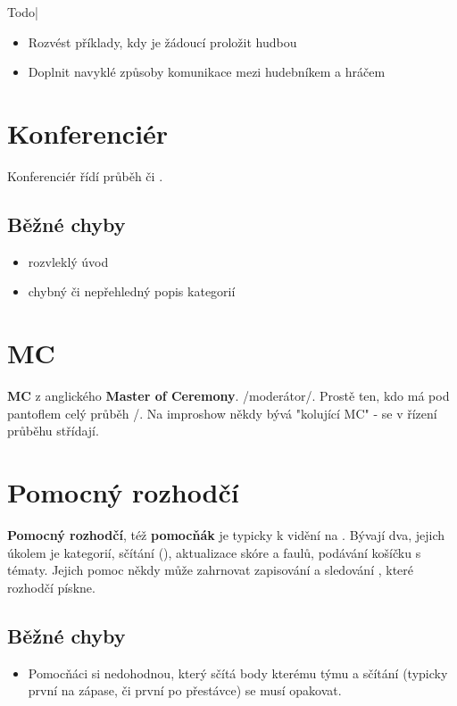{{Todo| 
\begin{itemize}
\item  Rozvést příklady, kdy je žádoucí proložit  hudbou
\item  Doplnit navyklé způsoby komunikace mezi hudebníkem a hráčem
\end{itemize}
}} 
 
\needspace{5cm} \section{Konferenciér} \label{konferenciér} Konferenciér řídí průběh  či . 
 
\subsection{Běžné chyby} \begin{itemize}
\item rozvleklý úvod
\item chybný či nepřehledný popis kategorií
\end{itemize}
 
 
 
\needspace{5cm} \section{MC} \label{mc} \textbf{MC}{} z anglického \textbf{Master of Ceremony}{}. /moderátor/. Prostě ten, kdo má pod pantoflem celý průběh /. 
Na improshow někdy bývá "kolující MC"{} -  se v řízení průběhu střídají. 
 
 
\needspace{5cm} \section{Pomocný rozhodčí} \label{pomocný rozhodčí} \textbf{Pomocný rozhodčí}{}, též \textbf{pomocňák}{} je typicky k vidění na . 
Bývají dva, jejich úkolem je  kategorií, sčítání  (), aktualizace skóre a faulů, podávání košíčku s tématy. Jejich pomoc  někdy může zahrnovat zapisování a sledování , které rozhodčí pískne. 
\subsection{Běžné chyby} \begin{itemize}
\item Pomocňáci si nedohodnou, který sčítá body kterému týmu a sčítání (typicky první na zápase, či první po přestávce) se musí opakovat.
\end{itemize}
 
